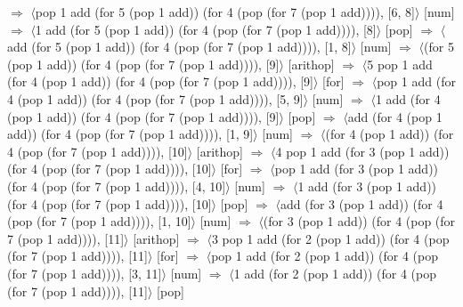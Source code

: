 \documentclass[12pt]{report}
\begin{document}
$\Rightarrow$ $\langle$pop 1 add (for 5 (pop 1 add)) (for 4 (pop (for 7 (pop 1 add)))), [6, 8]$\rangle$ \hfill [num] \newline
$\Rightarrow$ $\langle$1 add (for 5 (pop 1 add)) (for 4 (pop (for 7 (pop 1 add)))), [8]$\rangle$ \hfill [pop] \newline
$\Rightarrow$ $\langle$add (for 5 (pop 1 add)) (for 4 (pop (for 7 (pop 1 add)))), [1, 8]$\rangle$ \hfill [num] \newline
$\Rightarrow$ $\langle$(for 5 (pop 1 add)) (for 4 (pop (for 7 (pop 1 add)))), [9]$\rangle$ \hfill [arithop] \newline
$\Rightarrow$ $\langle$5 pop 1 add (for 4 (pop 1 add)) (for 4 (pop (for 7 (pop 1 add)))), [9]$\rangle$ \hfill [for] \newline
$\Rightarrow$ $\langle$pop 1 add (for 4 (pop 1 add)) (for 4 (pop (for 7 (pop 1 add)))), [5, 9]$\rangle$ \hfill [num] \newline
$\Rightarrow$ $\langle$1 add (for 4 (pop 1 add)) (for 4 (pop (for 7 (pop 1 add)))), [9]$\rangle$ \hfill [pop] \newline
$\Rightarrow$ $\langle$add (for 4 (pop 1 add)) (for 4 (pop (for 7 (pop 1 add)))), [1, 9]$\rangle$ \hfill [num] \newline
$\Rightarrow$ $\langle$(for 4 (pop 1 add)) (for 4 (pop (for 7 (pop 1 add)))), [10]$\rangle$ \hfill [arithop] \newline
$\Rightarrow$ $\langle$4 pop 1 add (for 3 (pop 1 add)) (for 4 (pop (for 7 (pop 1 add)))), [10]$\rangle$ \hfill [for] \newline
$\Rightarrow$ $\langle$pop 1 add (for 3 (pop 1 add)) (for 4 (pop (for 7 (pop 1 add)))), [4, 10]$\rangle$ \hfill [num] \newline
$\Rightarrow$ $\langle$1 add (for 3 (pop 1 add)) (for 4 (pop (for 7 (pop 1 add)))), [10]$\rangle$ \hfill [pop] \newline
$\Rightarrow$ $\langle$add (for 3 (pop 1 add)) (for 4 (pop (for 7 (pop 1 add)))), [1, 10]$\rangle$ \hfill [num] \newline
$\Rightarrow$ $\langle$(for 3 (pop 1 add)) (for 4 (pop (for 7 (pop 1 add)))), [11]$\rangle$ \hfill [arithop] \newline
$\Rightarrow$ $\langle$3 pop 1 add (for 2 (pop 1 add)) (for 4 (pop (for 7 (pop 1 add)))), [11]$\rangle$ \hfill [for] \newline
$\Rightarrow$ $\langle$pop 1 add (for 2 (pop 1 add)) (for 4 (pop (for 7 (pop 1 add)))), [3, 11]$\rangle$ \hfill [num] \newline
$\Rightarrow$ $\langle$1 add (for 2 (pop 1 add)) (for 4 (pop (for 7 (pop 1 add)))), [11]$\rangle$ \hfill [pop] \newline
\end{document}
